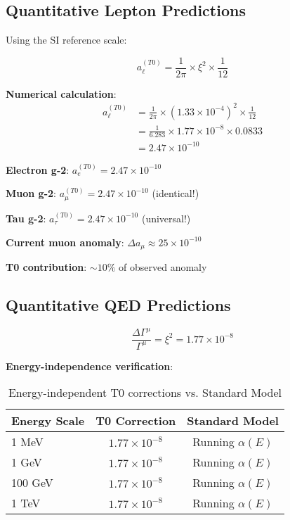 \documentclass[12pt,a4paper]{article}
\newcommand{\xipar}{\xi}
\theoremstyle{definition}
\theoremstyle{remark}
\begin{document}
	\subsection{Quantitative Lepton Predictions}
	
	Using the SI reference scale:
	
	\begin{equation}
		a_{\ell}^{(T0)} = \frac{1}{2\pi} \times \xipar^2 \times \frac{1}{12}
		\label{eq:quantitative_lepton_correction}
	\end{equation}
	
	\textbf{Numerical calculation}:
	\begin{align}
		a_{\ell}^{(T0)} &= \frac{1}{2\pi} \times (1.33 \times 10^{-4})^2 \times \frac{1}{12} \\
		&= \frac{1}{6.283} \times 1.77 \times 10^{-8} \times 0.0833 \\
		&= 2.47 \times 10^{-10}
	\end{align}
	
	\begin{tcolorbox}[colback=blue!5!white,colframe=blue!75!black,title=Universal Lepton Prediction]
		\textbf{Electron g-2}: $a_e^{(T0)} = 2.47 \times 10^{-10}$
		
		\textbf{Muon g-2}: $a_{\mu}^{(T0)} = 2.47 \times 10^{-10}$ (identical!)
		
		\textbf{Tau g-2}: $a_{\tau}^{(T0)} = 2.47 \times 10^{-10}$ (universal!)
		
		\textbf{Current muon anomaly}: $\Delta a_{\mu} \approx 25 \times 10^{-10}$
		
		\textbf{T0 contribution}: $\sim 10\%$ of observed anomaly
	\end{tcolorbox}
	
	\subsection{Quantitative QED Predictions}
	
	\begin{equation}
		\frac{\Delta\Gamma^{\mu}}{\Gamma^{\mu}} = \xipar^2 = 1.77 \times 10^{-8}
		\label{eq:quantitative_qed_correction}
	\end{equation}
	
	\textbf{Energy-independence verification}:
	\begin{table}[htbp]
		\centering
		\begin{tabular}{lcc}
			\toprule
			\textbf{Energy Scale} & \textbf{T0 Correction} & \textbf{Standard Model} \\
			\midrule
			1 MeV & $1.77 \times 10^{-8}$ & Running $\alpha(E)$ \\
			1 GeV & $1.77 \times 10^{-8}$ & Running $\alpha(E)$ \\
			100 GeV & $1.77 \times 10^{-8}$ & Running $\alpha(E)$ \\
			1 TeV & $1.77 \times 10^{-8}$ & Running $\alpha(E)$ \\
			\bottomrule
		\end{tabular}
		\caption{Energy-independent T0 corrections vs. Standard Model}
	\end{table}
	
\end{document}
